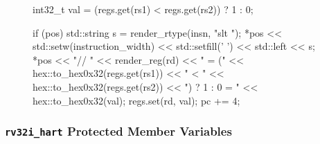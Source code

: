 \documentclass{article}
\begin{document}
\begin{itemize}
\begin{figure}[ht]
\begin{minipage}{\textwidth}
{\begin{tty}
{    int32_t val = (regs.get(rs1) < regs.get(rs2)) ? 1 : 0;

    if (pos)
    {
        std::string s = render_rtype(insn, "slt    ");
        *pos << std::setw(instruction_width) << std::setfill(' ') << std::left << s;
        *pos << "// " << render_reg(rd) << " = (" << hex::to_hex0x32(regs.get(rs1)) << " < " << hex::to_hex0x32(regs.get(rs2)) << ") ? 1 : 0 = " << hex::to_hex0x32(val);
    }
    regs.set(rd, val);
    pc += 4;
}
\end{tty}
}\end{minipage}
\label{exec:slt}
\end{figure}


\end{itemize}






\subsubsection{{\tt rv32i\_hart} Protected Member Variables}
\end{document}
